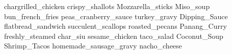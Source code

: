 chargrilled\_chicken crispy\_shallots Mozzarella\_sticks Miso\_soup bun\_french\_fries peas\_cranberry\_sauce turkey\_gravy Dipping\_Sauce flatbread\_sandwich succulent\_scallops roasted\_pecans Panang\_Curry freshly\_steamed char\_siu sesame\_chicken taco\_salad Coconut\_Soup Shrimp\_Tacos homemade\_sausage\_gravy nacho\_cheese 
